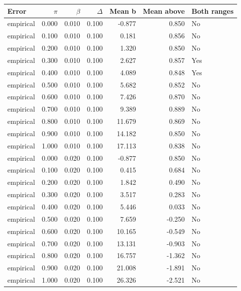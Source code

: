 \begin{tabular}{lrrrrrl}
\toprule
Error & $\pi$ & $\beta$ & $\Delta$ & Mean b & Mean above & Both ranges \\
\midrule
empirical & 0.000 & 0.010 & 0.100 & -0.877 & 0.850 & No \\
empirical & 0.100 & 0.010 & 0.100 & 0.181 & 0.856 & No \\
empirical & 0.200 & 0.010 & 0.100 & 1.320 & 0.850 & No \\
empirical & 0.300 & 0.010 & 0.100 & 2.627 & 0.857 & Yes \\
empirical & 0.400 & 0.010 & 0.100 & 4.089 & 0.848 & Yes \\
empirical & 0.500 & 0.010 & 0.100 & 5.682 & 0.852 & No \\
empirical & 0.600 & 0.010 & 0.100 & 7.426 & 0.870 & No \\
empirical & 0.700 & 0.010 & 0.100 & 9.389 & 0.889 & No \\
empirical & 0.800 & 0.010 & 0.100 & 11.679 & 0.869 & No \\
empirical & 0.900 & 0.010 & 0.100 & 14.182 & 0.850 & No \\
empirical & 1.000 & 0.010 & 0.100 & 17.113 & 0.838 & No \\
empirical & 0.000 & 0.020 & 0.100 & -0.877 & 0.850 & No \\
empirical & 0.100 & 0.020 & 0.100 & 0.415 & 0.684 & No \\
empirical & 0.200 & 0.020 & 0.100 & 1.842 & 0.490 & No \\
empirical & 0.300 & 0.020 & 0.100 & 3.517 & 0.283 & No \\
empirical & 0.400 & 0.020 & 0.100 & 5.446 & 0.033 & No \\
empirical & 0.500 & 0.020 & 0.100 & 7.659 & -0.250 & No \\
empirical & 0.600 & 0.020 & 0.100 & 10.165 & -0.549 & No \\
empirical & 0.700 & 0.020 & 0.100 & 13.131 & -0.903 & No \\
empirical & 0.800 & 0.020 & 0.100 & 16.757 & -1.362 & No \\
empirical & 0.900 & 0.020 & 0.100 & 21.008 & -1.891 & No \\
empirical & 1.000 & 0.020 & 0.100 & 26.326 & -2.521 & No \\
\bottomrule
\end{tabular}
\par\medskip
